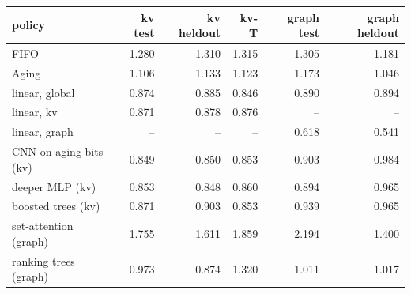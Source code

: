 \begin{tabular}{lrrrrr}
\toprule
policy & kv test & kv heldout & kv-T & graph test & graph heldout \\
\midrule
FIFO & 1.280 & 1.310 & 1.315 & 1.305 & 1.181 \\
Aging & 1.106 & 1.133 & 1.123 & 1.173 & 1.046 \\
linear, global & 0.874 & 0.885 & 0.846 & 0.890 & 0.894 \\
linear, kv & 0.871 & 0.878 & 0.876 & -- & -- \\
linear, graph & -- & -- & -- & 0.618 & 0.541 \\
CNN on aging bits (kv) & 0.849 & 0.850 & 0.853 & 0.903 & 0.984 \\
deeper MLP (kv) & 0.853 & 0.848 & 0.860 & 0.894 & 0.965 \\
boosted trees (kv) & 0.871 & 0.903 & 0.853 & 0.939 & 0.965 \\
set-attention (graph) & 1.755 & 1.611 & 1.859 & 2.194 & 1.400 \\
ranking trees (graph) & 0.973 & 0.874 & 1.320 & 1.011 & 1.017 \\
\bottomrule
\end{tabular}
